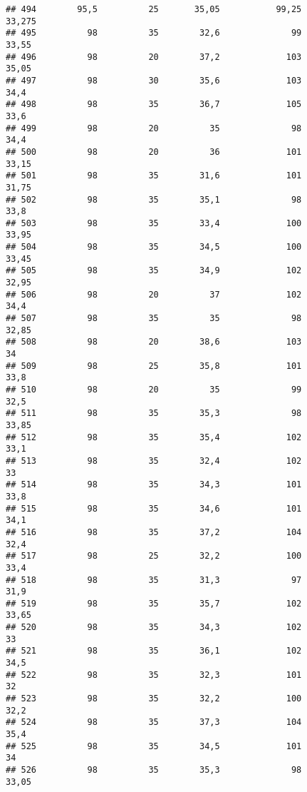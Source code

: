 \documentclass[
]{article}
\begin{document}
\begin{verbatim}
## 494        95,5          25       35,05           99,25               33,275
## 495          98          35        32,6              99                33,55
## 496          98          20        37,2             103                35,05
## 497          98          30        35,6             103                 34,4
## 498          98          35        36,7             105                 33,6
## 499          98          20          35              98                 34,4
## 500          98          20          36             101                33,15
## 501          98          35        31,6             101                31,75
## 502          98          35        35,1              98                 33,8
## 503          98          35        33,4             100                33,95
## 504          98          35        34,5             100                33,45
## 505          98          35        34,9             102                32,95
## 506          98          20          37             102                 34,4
## 507          98          35          35              98                32,85
## 508          98          20        38,6             103                   34
## 509          98          25        35,8             101                 33,8
## 510          98          20          35              99                 32,5
## 511          98          35        35,3              98                33,85
## 512          98          35        35,4             102                 33,1
## 513          98          35        32,4             102                   33
## 514          98          35        34,3             101                 33,8
## 515          98          35        34,6             101                 34,1
## 516          98          35        37,2             104                 32,4
## 517          98          25        32,2             100                 33,4
## 518          98          35        31,3              97                 31,9
## 519          98          35        35,7             102                33,65
## 520          98          35        34,3             102                   33
## 521          98          35        36,1             102                 34,5
## 522          98          35        32,3             101                   32
## 523          98          35        32,2             100                 32,2
## 524          98          35        37,3             104                 35,4
## 525          98          35        34,5             101                   34
## 526          98          35        35,3              98                33,05

\end{verbatim}
\end{document}
